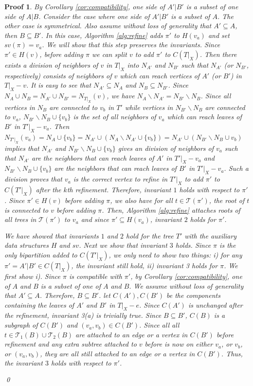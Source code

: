 \documentclass[twocolumn]{bmcart}%
\theoremstyle{mystyle}
\theoremstyle{proofstyle}
\newtheorem*{proof2}{Proof}
\newenvironment{proofnospace}{\begin{proof2}}{\qed \end{proof2}}
\begin{document}
\begin{proofnospace}
    By Corollary \ref{cor:compatibility}, one side of $A'|B'$ is a subset of one side of $A|B$. Consider the case where one side of $A'|B'$ is a subset of $A$. The other case is symmetrical. Also assume without loss of generality that $A' \subseteq A$, then $B \subseteq B'$. In this case, Algorithm \ref{alg:refine} adds $\pi'$ to $H(v_a)$ and set $sv(\pi) = v_a$. We will show that this step preserves the invariants. Since $\pi' \in H(v)$, before adding $\pi$ we can split $v$ to add $\pi'$ to $C(T|_X)$. Then there exists a division of neighbors of $v$ in $T|_X$ into $N_{A'}$ and $N_{B'}$ such that $N_{A'}$ (or $N_{B'}$, respectively) consists of neighbors of $v$ which can reach vertices of $A'$ (or $B'$) in $T|_X - v$. It is easy to see that $N_{A'} \subseteq N_A$ and $N_B \subseteq N_{B'}$. Since $N_A \cup N_B = N_{A'} \cup N_{B'} = N_{T|_X}(v)$, we have $N_A \backslash N_{A'} = N_{B'} \backslash N_B$. Since all vertices in $N_B$ are connected to $v_b$ in $T'$ while vertices in $N_{B'} \backslash N_B$ are connected to $v_a$, $N_{B'} \backslash N_B \cup \{v_b\}$ is the set of all neighbors of $v_a$ which can reach leaves of $B'$ in $T'|_X - v_a$. Then $N_{T'|_X}(v_a) = N_A \cup \{v_b\} = N_{A'} \cup (N_A \backslash N_{A'} \cup \{v_b\}) = N_{A'} \cup (N_{B'} \backslash N_B \cup v_b)$ implies that $N_{A'}$ and $N_{B'} \backslash N_B \cup \{v_b\}$ gives an division of neighbors of $v_a$ such that $N_{A'}$ are the neighbors that can reach leaves of $A'$ in $T'|_X -v_a$ and $N_{B'} \backslash N_B \cup \{v_b\}$ are the neighbors that can reach leaves of $B'$ in $T'|_X -v_a$. Such a division proves that $v_a$ is the correct vertex to refine in $T'|_X$ to add $\pi'$ to $C(T'|_X)$ after the $k$th refinement. Therefore, invariant $1$ holds with respect to $\pi'$. Since $\pi' \in H(v)$ before adding $\pi$, we also have for all $t \in \mathcal{T}(\pi')$, the root of $t$ is connected to $v$ before adding $\pi$. Then, Algorithm \ref{alg:refine} attaches roots of all trees in $\mathcal{T}(\pi')$ to $v_a$ and since $\pi' \subseteq H(v_a)$, invariant $2$ holds for $\pi'$. 

    We have showed that invariants $1$ and $2$ hold for the tree $T'$ with the auxiliary data structures $H$ and $sv$. Next we show that invariant $3$ holds. Since $\pi$ is the only bipartition added to $C(T'|_X)$, we only need to show two things: i) for any $\pi'=A'|B' \in C(T|_X)$, the invariant still hold, ii) invariant 3 holds for $\pi$. We first show i). Since $\pi$ is compatible with $\pi'$, by Corollary \ref{cor:compatibility}, one of $A$ and $B$ is a subset of one of $A$ and $B$. We assume without loss of generality that $A' \subseteq A$. Therefore, $B \subseteq B'$. let $C(A'), C(B')$ be the components containing the leaves of $A'$ and $B'$ in $T|_X - e$. Since $C(A')$ is unchanged after the refinement, invariant 3(a) is trivially true. Since $B \subseteq B'$, $C(B)$ is a subgraph of $C(B')$ and $(v_a,v_b) \in C(B')$. Since all all $t \in \mathcal{T}_1(B)\cup \mathcal{T}_2(B)$ are attached to an edge or a vertex in $C(B')$ before refinement and any extra subtree attached to $v$ before is now on either $v_a$, or $v_b$, or $(v_a,v_b)$, they are all still attached to an edge or a vertex in $C(B')$. Thus, the invariant $3$ holds with respect to $\pi'$. 
    

\end{proofnospace}
\end{document}

